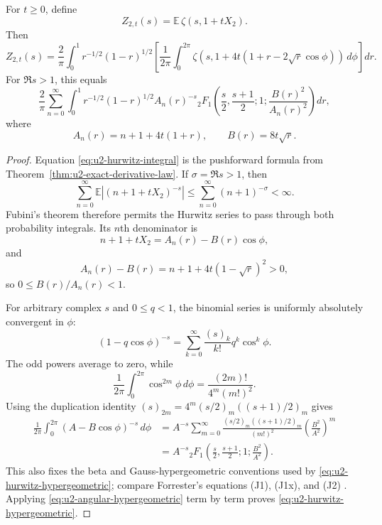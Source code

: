 \begin{corollary}
\label{cor:u2-shifted-hurwitz-transform}
For $t\ge0$, define
\[
 Z_{2,t}(s)=\mathbb E\,\zeta(s,1+tX_2).
\]
Then
\begin{equation}
 Z_{2,t}(s)=\frac2\pi\int_0^1r^{-1/2}(1-r)^{1/2}
 \left[
  \frac1{2\pi}\int_0^{2\pi}
  \zeta\!\left(s,1+4t(1+r-2\sqrt r\cos\phi)\right)\,d\phi
 \right]dr.
 \label{eq:u2-hurwitz-integral}
\end{equation}
For $\Re s>1$, this equals
\begin{equation}
 \frac2\pi\sum_{n=0}^{\infty}\int_0^1
 r^{-1/2}(1-r)^{1/2}A_n(r)^{-s}
 {}_2F_1\!\left(
 \frac s2,\frac{s+1}{2};1;\frac{B(r)^2}{A_n(r)^2}
 \right)dr,
 \label{eq:u2-hurwitz-hypergeometric}
\end{equation}
where
\begin{equation}
 A_n(r)=n+1+4t(1+r),
 \qquad
 B(r)=8t\sqrt r.
 \label{eq:u2-An-B}
\end{equation}
\end{corollary}

\begin{proof}
Equation \eqref{eq:u2-hurwitz-integral} is the pushforward formula from
Theorem~\ref{thm:u2-exact-derivative-law}.  If $\sigma=\Re s>1$, then
\[
 \sum_{n=0}^{\infty}
 \mathbb E\left|(n+1+tX_2)^{-s}\right|
 \le\sum_{n=0}^{\infty}(n+1)^{-\sigma}<\infty.
\]
Fubini's theorem therefore permits the Hurwitz series to pass through both probability
integrals.  Its $n$th denominator is
\[
 n+1+tX_2=A_n(r)-B(r)\cos\phi,
\]
and
\begin{equation}
 A_n(r)-B(r)=n+1+4t(1-\sqrt r)^2>0,
 \label{eq:u2-positive-denominator}
\end{equation}
so $0\le B(r)/A_n(r)<1$.

For arbitrary complex $s$ and $0\le q<1$, the binomial series is uniformly absolutely
convergent in $\phi$:
\[
 (1-q\cos\phi)^{-s}
 =\sum_{k=0}^{\infty}\frac{(s)_k}{k!}q^k\cos^k\phi.
\]
The odd powers average to zero, while
\[
 \frac1{2\pi}\int_0^{2\pi}\cos^{2m}\phi\,d\phi
 =\frac{(2m)!}{4^m(m!)^2}.
\]
Using the duplication identity
$(s)_{2m}=4^m(s/2)_m((s+1)/2)_m$ gives
\begin{align}
 \frac1{2\pi}\int_0^{2\pi}(A-B\cos\phi)^{-s}\,d\phi
 &=A^{-s}\sum_{m=0}^{\infty}
 \frac{(s/2)_m((s+1)/2)_m}{(m!)^2}
 \left(\frac{B^2}{A^2}\right)^m\\
 &=A^{-s}{}_2F_1\!\left(
 \frac s2,\frac{s+1}{2};1;\frac{B^2}{A^2}
 \right).
 \label{eq:u2-angular-hypergeometric}
\end{align}
This also fixes the beta and Gauss-hypergeometric conventions used by
\eqref{eq:u2-hurwitz-hypergeometric}; compare Forrester's equations (J1), (J1x), and (J2)
\cite{forrester2022}.  Applying \eqref{eq:u2-angular-hypergeometric} term by term proves
\eqref{eq:u2-hurwitz-hypergeometric}.
\end{proof}

